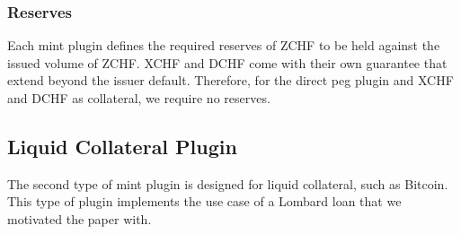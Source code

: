 \documentclass[english,11pt]{article}
\newcommand{\nothing}[1]{}
\begin{document}
\subsubsection{Reserves}
Each mint plugin defines the required reserves of ZCHF to be held against
the issued volume of ZCHF. XCHF and DCHF come with their own guarantee
that extend beyond the issuer default. Therefore, for the direct peg 
plugin and XCHF and DCHF as collateral, we require no reserves.

\nothing{
To guard against default risk of an issuer, minting should be limited to the staked amount of Frankencoins in the governance contract. That way, the Frankencoin could absorb a total loss of value of one of the pegged stablecoins. In case of a loss of trust in the pegged stablecoin, it would be challenged in a vote of distrust the remaining coins auctioned off, with the stakers having to take a loss in case the auction does reach a 1:1 conversion rate.
}

\subsection{Liquid Collateral Plugin}
The second type of mint plugin is designed for liquid collateral, such as
Bitcoin. This type of plugin implements the use case of a Lombard loan that
we motivated the paper with.
\end{document}
